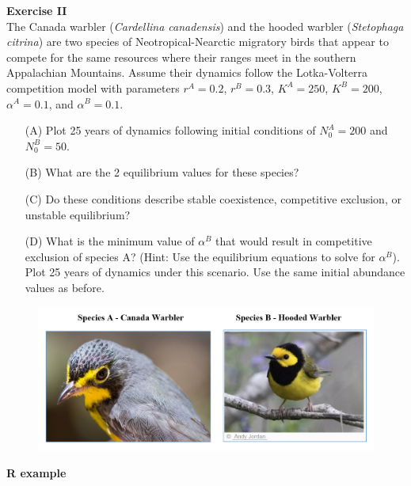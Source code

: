 \documentclass[12pt]{article}\usepackage[]{graphicx}\usepackage[]{color}
\begin{document}
\clearpage

{\bf Exercise II \\}
The Canada warbler (\textit{Cardellina canadensis}) and the hooded
warbler ({\it Stetophaga citrina}) are two species of
Neotropical-Nearctic migratory birds that appear to compete for the
same resources where their ranges meet in the southern Appalachian
Mountains. Assume their dynamics follow the Lotka-Volterra competition
model with parameters $r^{A}=0.2$, $r^{B}=0.3$,
$K^{A}=250$, $K^{B}=200$, $\alpha^{A}=0.1$, and 
$\alpha^{B}=0.1$.   
\begin{enumerate}
  \item[(A)] Plot 25 years of dynamics following initial conditions of 
    $N_0^A = 200$ and $N_0^B=50$.  
  \item[(B)] What are the 2 equilibrium values for these species?
  \item[(C)] Do these conditions describe stable coexistence,
    competitive exclusion, or unstable equilibrium?  
  \item[(D)] What is the minimum value of $\alpha^B$ that would result in
    competitive exclusion of species A? (Hint: Use the equilibrium
    equations to solve for $\alpha^B$). Plot 25 years of dynamics under
    this scenario. Use the same initial abundance values as before. 
\end{enumerate}


\vspace{12pt}

\begin{figure}[h!]
  \centering
  \includegraphics[width=\textwidth]{cawa-howa}
  \label{fig:cawa-howa}
\end{figure}


\clearpage

{\bf R example \\}
\end{document}

